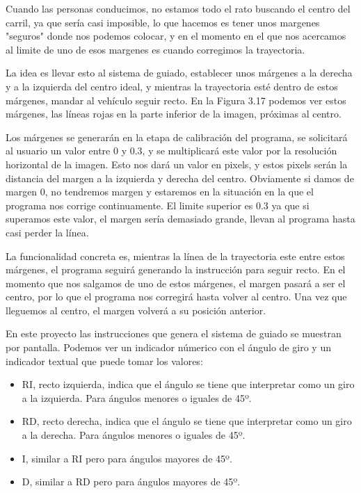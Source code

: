 Cuando las personas conducimos, no estamos todo el rato buscando el centro del carril, ya que sería casi imposible, lo que hacemos es tener unos margenes "seguros" donde nos podemos colocar, y en el momento en el que nos acercamos al limite de uno de esos margenes es cuando corregimos la trayectoria.

La idea es llevar esto al sistema de guiado, establecer unos márgenes a la derecha y a la izquierda del centro ideal, y mientras la trayectoria esté dentro de estos márgenes, mandar al vehículo seguir recto. En la Figura 3.17 podemos ver estos márgenes, las líneas rojas en la parte inferior de la imagen, próximas al centro.

Los márgenes se generarán en la etapa de calibración del programa, se solicitará al usuario un valor entre 0 y 0.3, y se multiplicará este valor por la resolución horizontal de la imagen. Esto nos dará un valor en pixels, y estos pixels serán la distancia del margen a la izquierda y derecha del centro. Obviamente si damos de margen 0, no tendremos margen y estaremos en la situación en la que el programa nos corrige continuamente. El limite superior es 0.3 ya que si superamos este valor, el margen sería demasiado grande, llevan al programa hasta casi perder la línea.

La funcionalidad concreta es, mientras la línea de la trayectoria este entre estos márgenes, el programa seguirá generando la instrucción para seguir recto. En el momento que nos salgamos de uno de estos márgenes, el margen pasará a ser el centro, por lo que el programa nos corregirá hasta volver al centro. Una vez que lleguemos al centro, el margen volverá a su posición anterior.

En este proyecto las instrucciones que genera el sistema de guiado se muestran por pantalla. Podemos ver un indicador númerico con el ángulo de giro y un indicador textual que puede tomar los valores:

\begin{itemize}

	\item RI, recto izquierda, indica que el ángulo se tiene que interpretar como un giro a la izquierda. Para ángulos menores o iguales de 45º.
	
	\item RD, recto derecha, indica que el ángulo se tiene que interpretar como un giro a la derecha. Para ángulos menores o iguales de 45º.
	\item I, similar a RI pero para ángulos mayores de 45º.
	
	\item D, similar a RD pero para ángulos mayores de 45º.
	
\end{itemize}

